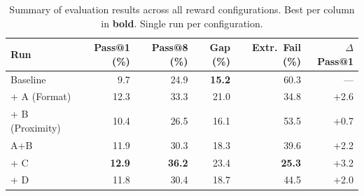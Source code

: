 \begin{table}[ht]
\centering
\caption{Summary of evaluation results across all reward configurations. Best per column in \textbf{bold}. Single run per configuration.}
\begin{tabular}{lrrrrr}
\toprule
Run & Pass@1 (\%) & Pass@8 (\%) & Gap (\%) & Extr.\ Fail (\%) & $\Delta$ Pass@1 \\
\midrule
Baseline & 9.7 & 24.9 & \textbf{15.2} & 60.3 & --- \\
\midrule
+ A (Format) & 12.3 & 33.3 & 21.0 & 34.8 & +2.6 \\
+ B (Proximity) & 10.4 & 26.5 & 16.1 & 53.5 & +0.7 \\
A+B & 11.9 & 30.3 & 18.3 & 39.6 & +2.2 \\
+ C & \textbf{12.9} & \textbf{36.2} & 23.4 & \textbf{25.3} & +3.2 \\
+ D & 11.8 & 30.4 & 18.7 & 44.5 & +2.0 \\
\bottomrule
\end{tabular}
\end{table}